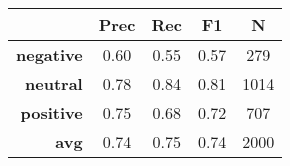 \begin{tabular}{|r|c|c|c|c|}
\hline
 & {\bf Prec} & {\bf Rec} & {\bf F1} & {\bf N}\\
\hline
{\bf negative} & 0.60 & 0.55 & 0.57 & 279\\
{\bf neutral} & 0.78 & 0.84 & 0.81 & 1014\\
{\bf positive} & 0.75 & 0.68 & 0.72 & 707\\
\hline
{\bf avg} & 0.74 & 0.75 & 0.74 & 2000\\
\hline
\end{tabular}